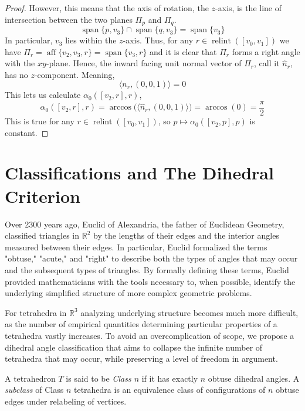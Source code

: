 \documentclass{mainresearch}
\begin{document}
\begin{proof}
	However, this means that the axis of rotation, the $z$-axis, is the line of intersection between the two planes $\Pi_p$ and $\Pi_q$.
	\[
	\operatorname{span}\{p,v_3\}\cap \operatorname{span}\{q,v_3\} = \operatorname{span}\{v_3\}
	\] 
	In particular, $v_3$ lies within the $z$-axis. Thus, for any $r\in \operatorname{relint}([v_0,v_1])$ we have $\Pi_r=\operatorname{aff}\{v_2,v_3,r\}=\operatorname{span}\{v_3,r\}$ and it is clear that $\Pi_r$ forms a right angle with the $xy$-plane. Hence, the inward facing unit normal vector of $\Pi_r$, call it $\hat n_r$, has no $z$-component. Meaning,
	\[
	\langle n_r ,(0,0,1) \rangle = 0
	\]
	This lets us calculate $\alpha_0([v_2,r],r)$,
	\[
	\alpha_0([v_2,r],r) =\arccos\!\big(\langle \hat n_r, (0,0,1)\rangle\big) = \arccos(0) = \frac{\pi}{2}
	\]
	This is true for any $r\in \operatorname{relint}([v_0,v_1])$, so $p \longmapsto \alpha_0([v_2,p],p)$ is constant.
	
	
\end{proof}

\section{Classifications and The Dihedral Criterion}\label{tetrahedra}
Over 2300 years ago, Euclid of Alexandria, the father of Euclidean Geometry, classified triangles in $\mathbb{R}^2$ by the lengths of their edges and the interior angles measured between their edges. In particular, Euclid formalized the terms "obtuse," "acute," and "right" to describe both the types of angles that may occur and the subsequent types of triangles. By formally defining these terms, Euclid provided mathematicians with the tools necessary to, when possible, identify the underlying simplified structure of more complex geometric problems.

For tetrahedra in $\mathbb{R}^3$ analyzing underlying structure becomes much more difficult, as the number of empirical quantities determining particular properties of a tetrahedra vastly increases. To avoid an overcomplication of scope, we propose a dihedral angle classification that aims to collapse the infinite number of tetrahedra that may occur, while preserving a level of freedom in argument.

\begin{defin}
	A tetrahedron $T$ is said to be \textit{Class $n$} if it has exactly $n$ obtuse dihedral angles. A \emph{subclass} of Class $n$ tetrahedra is an equivalence class of 
	configurations of $n$ obtuse edges under relabeling of vertices.
\end{defin}
\end{document}
